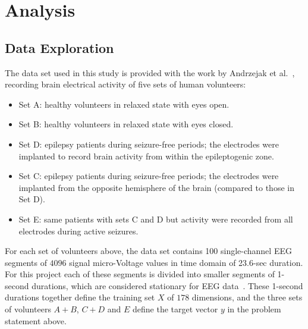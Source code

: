 \documentclass[12pt]{article}
\begin{document}

\section{Analysis}

\subsection{Data Exploration}

\label{sec:data_set}
The data set used in this study is provided with the work by Andrzejak et al.~\cite{andrzejak2001indications}, recording brain electrical activity of five sets of human volunteers:
\begin{itemize}
\item Set A: healthy volunteers in relaxed state with eyes open.
\item Set B: healthy volunteers in relaxed state with eyes closed.
\item Set D: epilepsy patients during seizure-free periods; the electrodes were implanted to record brain activity from within the epileptogenic zone.
\item Set C: epilepsy patients during seizure-free periods; the electrodes were implanted from the opposite hemisphere of the brain (compared to those in Set D).
\item Set E: same patients with sets C and D but activity were recorded from all electrodes during active seizures.
\end{itemize}

For each set of volunteers above, the data set contains 100 single-channel EEG segments of $4096$ signal micro-Voltage values in time domain of 23.6-sec duration. For this project each of these segments is divided into smaller segments of 1-second durations, which are considered stationary for EEG data~\cite{nigam2004neural}. These 1-second durations together define the training set $X$ of $178$ dimensions, and the three sets of volunteers $A + B$, $C + D$ and $E$ define the target vector $y$ in the problem statement above.
\end{document}
